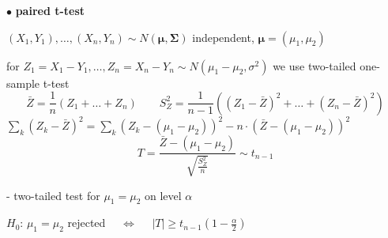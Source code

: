 \documentclass[twoside]{book}
\begin{document}
\pagestyle{empty}

\def\dr #1{\par\noindent $\bullet$ {\bf #1}}



\dr{paired t-test}
\vspace*{2mm}
\par $(X_{1},Y_{1}),\dots,(X_{n},Y_{n})\sim N(\boldsymbol\mu,\boldsymbol\Sigma)$ independent, $\boldsymbol\mu=(\mu_1,\mu_2)$
\vspace*{2mm}
\par for $Z_{1}=X_{1}-Y_{1},\dots,Z_{n}=X_{n}-Y_{n}\sim N(\mu_1-\mu_2,\sigma^2)$ we use two-tailed one-sample t-test
$$\bar{Z}=\frac1{n}\left(Z_1 + \dots + Z_{n}\right) \qquad S_{Z}^2=\frac1{n-1}\left((Z_1-\bar{Z})^2 + \dots + (Z_{n}-\bar{Z})^2\right)$$
$\sum_{k}(Z_{k}-\bar{Z})^2=   \sum_{k}(Z_{k}-(\mu_1-\mu_2))^2- n\cdot (\bar{Z}-(\mu_1-\mu_2))^2    $
$$ \qquad T=\frac{\bar{Z}-(\mu_1-\mu_2)}{\sqrt{\frac{S_{Z}^2}{n}}}\sim t_{n-1}\qquad     $$
\par\noindent - two-tailed test for $\mu_1=\mu_2$ on level $\alpha$
\vspace*{3mm}
\par $H_0$:  $\mu_1=\mu_2$ rejected $\quad\Longleftrightarrow\quad$
     $|T|\geq t_{n-1}(1-\frac{\alpha}2)$
\end{document}
